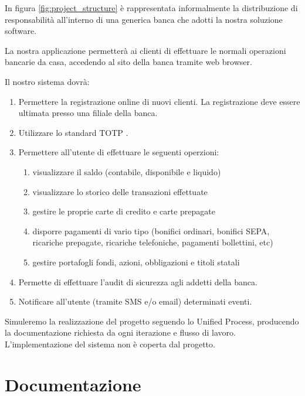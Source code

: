 \documentclass[10pt]{softeng} %
\begin{document}
In figura \ref{fig:project_structure} \`e rappresentata informalmente la distribuzione di responsabilit\`a all'interno di una generica banca che adotti la nostra soluzione software.

La nostra applicazione permetter\`a ai clienti di effettuare le normali operazioni bancarie da casa, accedendo al sito della banca tramite web browser.

Il nostro sistema dovr\`a:
\begin{enumerate}
	\item Permettere la registrazione online di nuovi clienti.
		La registrazione deve essere ultimata presso una filiale della banca.
	\item Utilizzare lo standard TOTP \cite{totprfc}.
	\item Permettere all'utente di effettuare le seguenti operzioni:
		\begin{enumerate}
			\item visualizzare il saldo (contabile, disponibile e liquido)
			\item visualizzare lo storico delle transazioni effettuate
			\item gestire le proprie carte di credito e carte prepagate
			\item disporre pagamenti di vario tipo (bonifici ordinari, bonifici SEPA, ricariche prepagate, ricariche telefoniche, pagamenti bollettini, etc)
			\item gestire portafogli fondi, azioni, obbligazioni e titoli statali %
		\end{enumerate}
	\item Permette di effettuare l'audit di sicurezza agli addetti della banca.
	\item Notificare all'utente (tramite SMS e/o email) determinati eventi.
\end{enumerate}

Simuleremo la realizzazione del progetto seguendo lo Unified Process, producendo la documentazione richiesta da ogni iterazione e flusso di lavoro.
L'implementazione del sistema non \`e coperta dal progetto.

\section{Documentazione}
\end{document}
